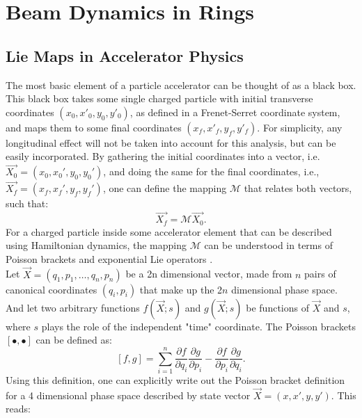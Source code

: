 \chapter{Beam Dynamics in Rings}
\label{sec:ch2}

\section{\label{sec:lie}Lie Maps in Accelerator Physics}

The most basic element of a particle accelerator can be thought of as a black box. This black box takes some single charged particle with initial transverse coordinates $\left( x_0,x'_0,y_0,y'_0 \right)$, as defined in a Frenet-Serret coordinate system, and maps them to some final coordinates $\left( x_f,x'_f,y_f,y'_f \right)$. For simplicity, any longitudinal effect will not be taken into account for this analysis, but can be easily incorporated. By gathering the initial coordinates into a vector, i.e. $\vec{X_0} = \left( x_0,x_0',y_0,y_0' \right)$, and doing the same for the final coordinates, i.e., $\vec{X_f} = \left( x_f,x_f',y_f,y_f' \right)$, one can define the mapping $\mathcal{M}$ that relates both vectors, such that:  
\begin{equation}
\label{eq:ch2map}
\vec{X_f}=\mathcal{M}\vec{X_0}.
\end{equation}
For a charged particle inside some accelerator element that can be described using Hamiltonian dynamics, the mapping $\mathcal{M}$ can be understood in terms of Poisson brackets and exponential Lie operators \cite{wolski,todd1,cernthesis1,cernthesis2}.\\
Let $\vec{X} = \left( q_1,p_1,\dots,q_{n},p_{n} \right)$ be a 2n dimensional vector, made from $n$ pairs of canonical coordinates $(q_i,p_i)$ that make up the 2$n$ dimensional phase space. And let two arbitrary functions $f\left( \vec{X};s\right)$ and $g\left( \vec{X};s\right)$ be functions of $\vec{X}$ and $s$, where $s$ plays the role of the independent "time" coordinate. The Poisson brackets $\left[ \bullet , \bullet \right]$ can be defined as:
\begin{equation}
    \label{eq:ch2poisson}
    \left[ f,g \right] = \sum_{i=1}^{n} \frac{\partial f}{\partial q_i}\frac{\partial g}{\partial p_i} - \frac{\partial f}{\partial p_i}\frac{\partial g}{\partial q_i}. 
\end{equation}
Using this definition, one can explicitly write out the Poisson bracket definition for a 4 dimensional phase space described by state vector $\vec{X} = \left( x,x',y,y' \right)$. This reads: 
